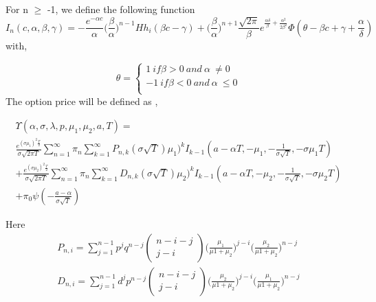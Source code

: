 \documentclass[12pt]{report}
\begin{document}
For n $\geqslant$ -1, we define the following function
\begin{equation}
I_n(c,\alpha,\beta,\gamma)=- \frac{e^{-\alpha c}}{\alpha} \big(\frac{\beta}{\alpha}\big)^{n-1}Hh_i(\beta c - \gamma)+\big(\frac{\beta}{\alpha}\big)^{n+1} \frac{\sqrt{2\pi}}{\beta}e^{\frac{\alpha \delta}{\beta}+\frac{\alpha^2}{2\beta^2}} \Phi(\theta-\beta c +\gamma+ \frac{\alpha}{\delta})
\end{equation}
with,

 \[\theta= \begin{cases} 
  1~ if \beta >0 ~and ~\alpha ~\neq  0\\
    -1~ if \beta < 0 ~and ~\alpha ~\leqslant 0\\
         \end{cases}
          \]
The option price will be defined as ,

\begin{gather}
\Upsilon(\alpha,\sigma,\lambda,p,\mu_1,\mu_2,a,T) = \nonumber \\
\frac{e^{(\sigma \mu_1)^2\frac{T}{2}}}{\sigma \sqrt{2 \pi T}} \sum\limits_{n=1}^\infty  \pi_n\sum\limits_{k=1}^\infty  P_{n,k}(\sigma \sqrt{T})\mu_1)^k I_{k-1}(a-\alpha T,-\mu_1 ,-\frac{1}{\sigma \sqrt{T}},-\sigma \mu_1 T ) \nonumber \\
+\frac{e^{(\sigma \mu_2)^2\frac{T}{2}}}{\sigma \sqrt{2 \pi T}} \sum\limits_{n=1}^\infty  \pi_n\sum\limits_{k=1}^\infty  D_{n,k}(\sigma \sqrt{T})\mu_2)^k I_{k-1}(a-\alpha T,-\mu_2 ,-\frac{1}{\sigma \sqrt{T}},-\sigma \mu_2 T ) \nonumber \\
+ \pi_0 \psi(-\frac{a- \alpha}{\sigma \sqrt{T}})    
\end{gather}

Here 
\begin{gather*}
P_{n,i}=\sum_{j=1}^{n-1} p^j q^{n-j} \left( \begin{matrix} n-i-j\\ j-i \end{matrix} \right) \big (\frac{\mu_1}{\mu1+\mu_2}\big )^{j-i}\big (\frac{\mu_2}{\mu1+\mu_2}\big )^{n-j} \\
D_{n,i}=\sum_{j=1}^{n-1} d^j p^{n-j} \left( \begin{matrix} n-i-j\\ j-i \end{matrix} \right) \big (\frac{\mu_2}{\mu1+\mu_2}\big )^{j-i}\big (\frac{\mu_1}{\mu1+\mu_2}\big )^{n-j}
\end{gather*}
\end{document}
